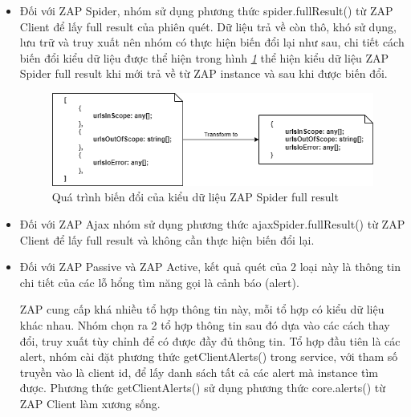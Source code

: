 \begin{itemize}
  \item Đối với ZAP Spider, nhóm sử dụng phương thức spider.fullResult() từ ZAP Client để lấy full result của phiên quét.
        Dữ liệu trả về còn thô, khó sử dụng, lưu trữ và truy xuất nên nhóm có thực hiện biến đổi lại như sau, chi tiết cách biến đổi kiểu dữ liệu được thể hiện trong hình \textit{\ref{fig:SpiderTransformData} } thể hiện kiểu dữ liệu ZAP Spider full result khi mới trả về từ ZAP instance và sau khi được biến đổi.
        \begin{figure}[H]
          \centering
          \includegraphics[width=\textwidth]{applied-thesis-chapters/chapter-4/Quá trình biến đổi của kiểu dữ liệu ZAP Spider full result.png}
          \caption{Quá trình biến đổi của kiểu dữ liệu ZAP Spider full result}
          \label{fig:SpiderTransformData}
        \end{figure}
  \item Đối với ZAP Ajax nhóm sử dụng phương thức ajaxSpider.fullResult() từ ZAP Client để lấy full result và không cần thực hiện biến đổi lại.
  \item Đối với ZAP Passive và ZAP Active, kết quả quét của 2 loại này là thông tin chi tiết của các lỗ hổng tìm năng gọi là cảnh báo (alert).

        ZAP cung cấp khá nhiều tổ hợp thông tin này, mỗi tổ hợp có kiểu dữ liệu khác nhau.
        Nhóm chọn ra 2 tổ hợp thông tin sau đó dựa vào các cách thay đổi, truy xuất tùy chỉnh để có được đầy đủ thông tin.
        Tổ hợp đầu tiên là các alert, nhóm cài đặt phương thức getClientAlerts() trong service, với tham số truyền vào là client id, để lấy danh sách tất cả các alert mà instance tìm được.
        Phương thức getClientAlerts() sử dụng phương thức core.alerts() từ ZAP Client làm xương sống.


\end{itemize}
